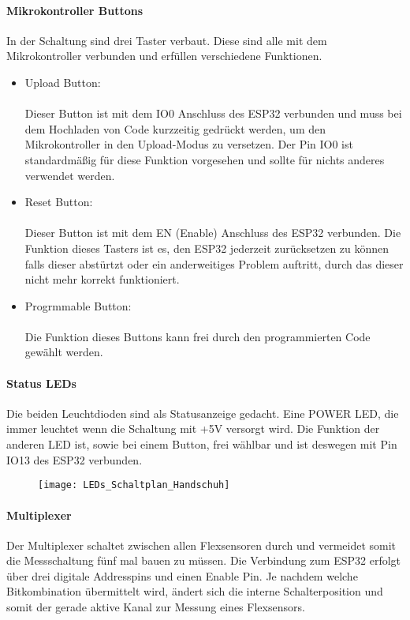 \documentclass[titlepage,12pt,twoside]{article}
\begin{document}
\paragraph{Mikrokontroller Buttons}
\hfill \break
\hfill \break
In der Schaltung sind drei Taster verbaut. Diese sind alle mit dem Mikrokontroller verbunden und erfüllen verschiedene Funktionen.
\begin{itemize}
	\item Upload Button: \\
		  \\ 
		  Dieser Button ist mit dem IO0 Anschluss des ESP32 verbunden und muss bei dem Hochladen von Code kurzzeitig gedrückt 
		  werden, um den Mikrokontroller in den Upload-Modus zu versetzen. Der Pin IO0 ist standardmäßig für diese Funktion vorgesehen
		  und sollte für nichts anderes verwendet werden. 
	\item Reset Button: \\
		  \\
		  Dieser Button ist mit dem EN (Enable) Anschluss des ESP32 verbunden. Die Funktion dieses Tasters ist es, den ESP32 jederzeit 
		  zurücksetzen zu können falls dieser abstürtzt oder ein anderweitiges Problem auftritt, durch das dieser nicht mehr korrekt
		  funktioniert.
	\item Progrmmable Button: \\
		  \\
		  Die Funktion dieses Buttons kann frei durch den programmierten Code gewählt werden. 
\end{itemize}

\paragraph{Status LEDs}
\hfill \break
\hfill \break
Die beiden Leuchtdioden sind als Statusanzeige gedacht. Eine POWER LED, die immer leuchtet wenn die Schaltung mit +5V
versorgt wird. Die Funktion der anderen LED ist, sowie bei einem Button, frei wählbar und ist deswegen mit Pin IO13 des ESP32
verbunden. \\
\begin{figure}[H]
	\begin{center}
		\scalebox{0.5}
		{\texttt{[image: LEDs\_Schaltplan\_Handschuh]}}
	\end{center}
\end{figure}

\paragraph{Multiplexer}
\hfill \break
\hfill \break
Der Multiplexer schaltet zwischen allen Flexsensoren durch und vermeidet somit die Messschaltung fünf mal bauen zu müssen. 
Die Verbindung zum ESP32 erfolgt über drei digitale Addresspins und einen Enable Pin. Je nachdem welche Bitkombination übermittelt
wird, ändert sich die interne Schalterposition und somit der gerade aktive Kanal zur Messung eines Flexsensors. \\
\\
\end{document}
